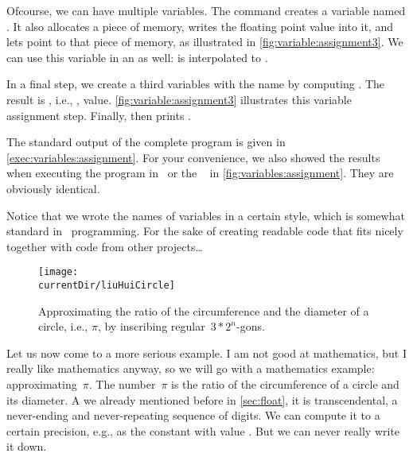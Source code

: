 Ofcourse, we can have multiple variables.
The command  creates a variable named .
It also allocates a piece of memory, writes the floating point value  into it, and lets  point to that piece of memory, as illustrated in \cref{fig:variable:assignment3}.
We can use this variable in an  as well:
 is interpolated to .%
%
\begin{sloppypar}%
In a final step, we create a third variables with the name  by computing .
The result is , i.e., ,  value.
\cref{fig:variable:assignment3} illustrates this variable assignment step.
Finally,  then prints .%
\end{sloppypar}%
%
The standard output of the complete program is given in \cref{exec:variables:assignment}.
For your convenience, we also showed the results when executing the program in \pycharm\ or the \ubuntu\  in \cref{fig:variables:assignment}.
They are obviously identical.

Notice that we wrote the names of variables in a certain style, which is somewhat standard in \python\ programming.
For the sake of creating readable code that fits nicely together with code from other projects\dots%
%
\FloatBarrier%
\endhsection%
%
%
%
\begin{figure}%
\centering%
\texttt{[image: \\currentDir/liuHuiCircle]}%
\caption{Approximating the ratio of the circumference and the diameter of a circle, i.e., $\pi$, by inscribing regular~$3*2^n$-gons.}%
\label{fig:liuHuiCircle}%
\end{figure}%
%
%
\def\liuhuir{\ensuremath{{\color{liuhui-r-color}r}}}%
%
\def\liuhuiss{\ensuremath{{\color{liuhui-s6-color}s_6}}}%
%
\def\liuhuist{\ensuremath{{\color{liuhui-s12-color}s_{12}}}}%
%
\def\liuhuiy{\ensuremath{{\color{liuhui-y-color}y}}}%
%
\def\liuhuix{\ensuremath{{\color{liuhui-x-color}x}}}%
%
\def\liuhuistf{\ensuremath{{\color{liuhui-s24-color}s_{24}}}}%
%
Let us now come to a more serious example.
I am not good at mathematics, but I really like mathematics anyway, so we will go with a mathematics example: approximating~$\pi$.
The number~$\pi$ is the ratio of the circumference of a circle and its diameter.
A we already mentioned before in \cref{sec:float}, it is transcendental, a never-ending and never-repeating sequence of digits.
We can compute it to a certain precision, e.g., as the  constant  with value .
But we can never really write it down.


